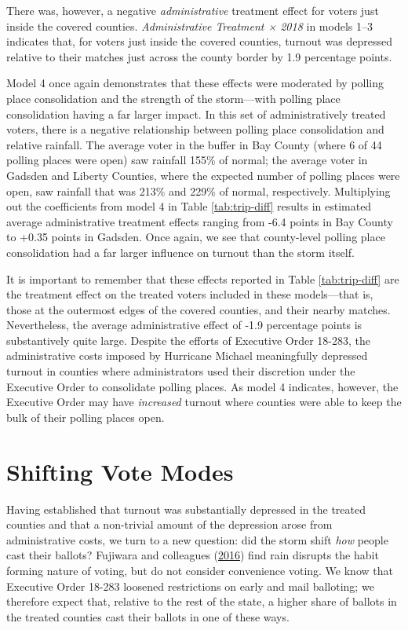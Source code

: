 \documentclass[
  12pt,
]{article}
\begin{document}
There was, however, a negative \emph{administrative} treatment effect for voters just inside the covered counties. \emph{Administrative Treatment × 2018} in models 1--3 indicates that, for voters just inside the covered counties, turnout was depressed relative to their matches just across the county border by 1.9 percentage points.

Model 4 once again demonstrates that these effects were moderated by polling place consolidation and the strength of the storm---with polling place consolidation having a far larger impact. In this set of administratively treated voters, there is a negative relationship between polling place consolidation and relative rainfall. The average voter in the buffer in Bay County (where 6 of 44 polling places were open) saw rainfall 155\% of normal; the average voter in Gadsden and Liberty Counties, where the expected number of polling places were open, saw rainfall that was 213\% and 229\% of normal, respectively. Multiplying out the coefficients from model 4 in Table \ref{tab:trip-diff} results in estimated average administrative treatment effects ranging from -6.4 points in Bay County to +0.35 points in Gadsden. Once again, we see that county-level polling place consolidation had a far larger influence on turnout than the storm itself.

It is important to remember that these effects reported in Table \ref{tab:trip-diff} are the treatment effect on the treated voters included in these models---that is, those at the outermost edges of the covered counties, and their nearby matches. Nevertheless, the average administrative effect of -1.9 percentage points is substantively quite large. Despite the efforts of Executive Order 18-283, the administrative costs imposed by Hurricane Michael meaningfully depressed turnout in counties where administrators used their discretion under the Executive Order to consolidate polling places. As model 4 indicates, however, the Executive Order may have \emph{increased} turnout where counties were able to keep the bulk of their polling places open.

\hypertarget{shifting-vote-modes}{%
\section*{Shifting Vote Modes}\label{shifting-vote-modes}}

Having established that turnout was substantially depressed in the treated counties and that a non-trivial amount of the depression arose from administrative costs, we turn to a new question: did the storm shift \emph{how} people cast their ballots? Fujiwara and colleagues (\protect\hyperlink{ref-Fujiwara2016}{2016}) find rain disrupts the habit forming nature of voting, but do not consider convenience voting. We know that Executive Order 18-283 loosened restrictions on early and mail balloting; we therefore expect that, relative to the rest of the state, a higher share of ballots in the treated counties cast their ballots in one of these ways.
\end{document}
